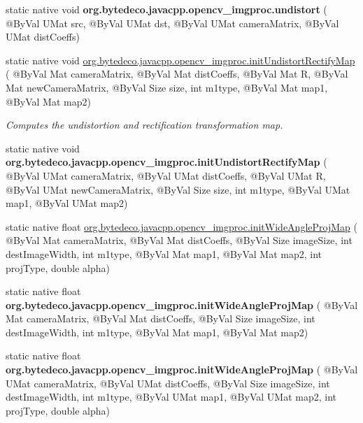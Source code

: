 \begin{DoxyCompactItemize}
static native void {\bfseries org.\+bytedeco.\+javacpp.\+opencv\+\_\+imgproc.\+undistort} ( @By\+Val U\+Mat src, @By\+Val U\+Mat dst, @By\+Val U\+Mat camera\+Matrix, @By\+Val U\+Mat dist\+Coeffs)
\item 
static native void \hyperlink{group__imgproc__transform_gaf3c4192c811a2204d996dacf82f23564}{org.\+bytedeco.\+javacpp.\+opencv\+\_\+imgproc.\+init\+Undistort\+Rectify\+Map} ( @By\+Val Mat camera\+Matrix, @By\+Val Mat dist\+Coeffs, @By\+Val Mat R, @By\+Val Mat new\+Camera\+Matrix, @By\+Val Size size, int m1type, @By\+Val Mat map1, @By\+Val Mat map2)
\begin{DoxyCompactList}\small\item\em Computes the undistortion and rectification transformation map. \end{DoxyCompactList}\item 
\mbox{\label{group__imgproc__transform_ga8a0564b5e37ec7d4c346fbad28d9760d}} 
static native void {\bfseries org.\+bytedeco.\+javacpp.\+opencv\+\_\+imgproc.\+init\+Undistort\+Rectify\+Map} ( @By\+Val U\+Mat camera\+Matrix, @By\+Val U\+Mat dist\+Coeffs, @By\+Val U\+Mat R, @By\+Val U\+Mat new\+Camera\+Matrix, @By\+Val Size size, int m1type, @By\+Val U\+Mat map1, @By\+Val U\+Mat map2)
\item 
static native float \hyperlink{group__imgproc__transform_ga797a671a89ffc5375a87366fbbb86c13}{org.\+bytedeco.\+javacpp.\+opencv\+\_\+imgproc.\+init\+Wide\+Angle\+Proj\+Map} ( @By\+Val Mat camera\+Matrix, @By\+Val Mat dist\+Coeffs, @By\+Val Size image\+Size, int dest\+Image\+Width, int m1type, @By\+Val Mat map1, @By\+Val Mat map2, int proj\+Type, double alpha)
\item 
\mbox{\label{group__imgproc__transform_ga6e408a41a589ec2bf508f17af2286c7c}} 
static native float {\bfseries org.\+bytedeco.\+javacpp.\+opencv\+\_\+imgproc.\+init\+Wide\+Angle\+Proj\+Map} ( @By\+Val Mat camera\+Matrix, @By\+Val Mat dist\+Coeffs, @By\+Val Size image\+Size, int dest\+Image\+Width, int m1type, @By\+Val Mat map1, @By\+Val Mat map2)
\item 
\mbox{\label{group__imgproc__transform_ga5bcc1506c8b48bb2a0c8c7c44f63b70c}} 
static native float {\bfseries org.\+bytedeco.\+javacpp.\+opencv\+\_\+imgproc.\+init\+Wide\+Angle\+Proj\+Map} ( @By\+Val U\+Mat camera\+Matrix, @By\+Val U\+Mat dist\+Coeffs, @By\+Val Size image\+Size, int dest\+Image\+Width, int m1type, @By\+Val U\+Mat map1, @By\+Val U\+Mat map2, int proj\+Type, double alpha)

\end{DoxyCompactItemize}
